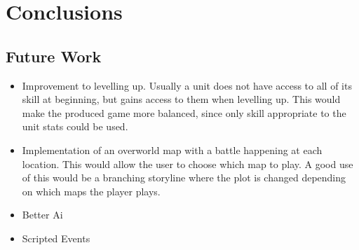 \section{Conclusions}


\subsection{Future Work}
\begin{itemize}
\item Improvement to levelling up. 
	Usually a unit does not have access to all of its skill at beginning, but gains access to them when levelling up.  This would make the produced game  more balanced, since only skill appropriate to the unit stats could be used.

\item Implementation of an overworld map with a battle happening at each location. This would allow the user to choose which map to play.  A good use of this would be a branching storyline where the plot is changed depending on which maps the player plays.
 
\item  Better Ai

\item Scripted Events

\end{itemize}